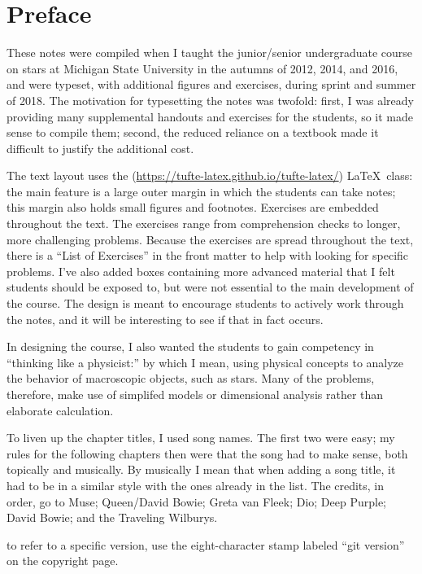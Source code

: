 
\section*{Preface}
These notes were compiled when I taught the junior/senior undergraduate course on stars at Michigan State University in the autumns of 2012, 2014, and 2016, and were typeset, with additional figures and exercises, during sprint and summer of 2018. The motivation for typesetting the notes was twofold: first, I was already providing many supplemental handouts and exercises for the students, so it made sense to compile them; second, the reduced reliance on a textbook made it difficult to justify the additional cost.

The text layout uses the  (\url{https://tufte-latex.github.io/tufte-latex/}) \LaTeX\ class: the main feature is a large outer margin in which the students can take notes; this margin also holds small figures and footnotes. Exercises are embedded throughout the text. The exercises range from comprehension checks to longer, more challenging problems.  Because the exercises are spread throughout the text, there is a ``List of Exercises'' in the front matter to help with looking for specific problems. I've also added boxes containing more advanced material that I felt students should be exposed to, but were not essential to the main development of the course. The design is meant to encourage students to actively work through the notes, and it will be interesting to see if that in fact occurs.

In designing the course, I also wanted the students to gain competency in ``thinking like a physicist:'' by which I mean, using physical concepts to analyze the behavior of macroscopic objects, such as stars. Many of the problems, therefore, make use of simplifed models or dimensional analysis rather than elaborate calculation. 

To liven up the chapter titles, I used song names. The first two were easy; my rules for the following chapters then were that the song had to make sense, both topically and musically. By musically I mean that when adding a song title, it had to be in a similar style with the ones already in the list. The credits, in order, go to Muse; Queen/David Bowie; Greta van Fleek; Dio; Deep Purple; David Bowie; and the Traveling Wilburys.

 to refer to a specific version, use the eight-character stamp labeled ``git version'' on the copyright page.
